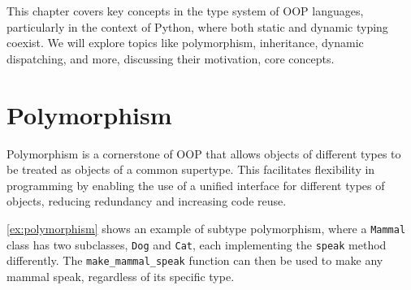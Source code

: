 \documentclass[oneside,11pt,dvipsnames]{book}
\newcommand{\code}[1]{\texttt{#1}}
\begin{document}
This chapter covers key concepts in the type system of OOP languages, particularly in the context of Python, where both static and dynamic typing coexist. We will explore topics like polymorphism, inheritance, dynamic dispatching, and more, discussing their motivation, core concepts. 






\section{Polymorphism}

Polymorphism is a cornerstone of OOP that allows objects of different types to be treated as objects of a common supertype. This facilitates flexibility in programming by enabling the use of a unified interface for different types of objects, reducing redundancy and increasing code reuse.

\autoref{ex:polymorphism} shows an example of subtype polymorphism, where a \code{Mammal} class has two subclasses, \code{Dog} and \code{Cat}, each implementing the \code{speak} method differently. The \code{make\_mammal\_speak} function can then be used to make any mammal speak, regardless of its specific type.
\end{document}
